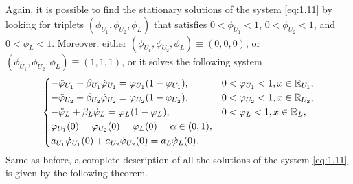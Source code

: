 Again, it is possible to find the stationary solutions of the system \eqref{eq:1.11} by looking for triplets \((\phi_{U_1}, \phi_{U_2}, \phi_L)\) that satisfies \(0 < \phi_{U_1} < 1\), \(0 < \phi_{U_2} < 1\), and \(0 < \phi_L < 1\). Moreover, either \((\phi_{U_1}, \phi_{U_2}, \phi_L) \equiv (0, 0, 0)\), or \((\phi_{U_1}, \phi_{U_2}, \phi_L) \equiv (1, 1, 1)\), or it solves the following system
\begin{equation}
    \begin{dcases}
        - \ddot{\varphi}_{U_1} + \beta_{U_1} \dot{\varphi}_{U_1} = \varphi_{U_1}(1 - \varphi_{U_1}), & 0 < \varphi_{U_1} < 1, x \in \mathbb{R}_{U_1}, \\
        - \ddot{\varphi}_{U_2} + \beta_{U_2} \dot{\varphi}_{U_2} = \varphi_{U_2}(1 - \varphi_{U_2}), & 0 < \varphi_{U_2} < 1, x \in \mathbb{R}_{U_2}, \\
        - \ddot{\varphi}_L + \beta_L \dot{\varphi}_L = \varphi_L(1 - \varphi_L), & 0 < \varphi_L < 1, x \in \mathbb{R}_L, \\
        \varphi_{U_1}(0) = \varphi_{U_2}(0) = \varphi_L(0) = \alpha \in (0, 1), \\
        a_{U_1} \dot{\varphi}_{U_1}(0) + a_{U_2} \dot{\varphi}_{U_2}(0) = a_L \dot{\varphi}_L(0).
    \end{dcases}
    \label{eq:1.14}
\end{equation}
Same as before, a complete description of all the solutions of the system \eqref{eq:1.11} is given by the following theorem.
